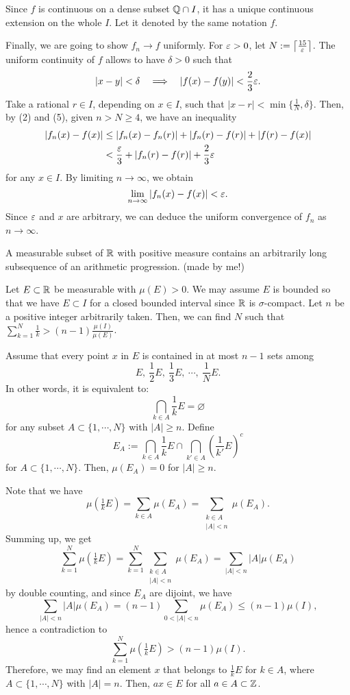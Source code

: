 \documentclass[12pt]{article}
\begin{document}
\begin{sol}
Since $f$ is continuous on a dense subset $\mathbb{Q}\cap I$, it has a unique continuous extension on the whole $I$.
Let it denoted by the same notation $f$.

\Step[4]
Finally, we are going to show $f_n\to f$ uniformly.
For $\varepsilon>0$, let $N:=\left\lceil\frac{15}{\varepsilon}\right\rceil$.
The uniform continuity of $f$ allows to have $\delta>0$ such that
\begin{align}|x-y|<\delta\impl|f(x)-f(y)|<\frac23\e.\end{align}
Take a rational $r\in I$, depending on $x\in I$, such that $|x-r|<\min\{\frac1N,\delta\}$.
Then, by (2) and (5), given $n>N\ge4$, we have an inequality
\begin{align*}
|f_n(x)-f(x)|&\le|f_n(x)-f_n(r)|+|f_n(r)-f(r)|+|f(r)-f(x)|\\
&<\frac{\varepsilon}3+|f_n(r)-f(r)|+\frac23\varepsilon
\end{align*}
for any $x\in I$.
By limiting $n\to\infty$, we obtain
\[\lim_{n\to\infty}|f_n(x)-f(x)|<\varepsilon.\]
Since $\varepsilon$ and $x$ are arbitrary, we can deduce the uniform convergence of $f_n$ as $n\to\infty$.
\end{sol}


\clearpage
\begin{prb}
A measurable subset of $\mathbb{R}$ with positive measure contains an arbitrarily long subsequence of an arithmetic progression. (made by me!)
\end{prb}
\begin{sol}
Let $E\subset\mathbb{R}$ be measurable with $\mu(E)>0$. We may assume $E$ is bounded so that we have $E\subset I$ for a closed bounded interval since $\mathbb{R}$ is $\sigma$-compact.
Let $n$ be a positive integer arbitrarily taken. Then, we can find $N$ such that $\sum_{k=1}^N\frac1k>(n-1)\frac{\mu(I)}{\mu(E)}$.

Assume that every point $x$ in $E$ is contained in at most $n-1$ sets among
\[E,\ \frac12E,\ \frac13E,\ \cdots,\ \frac1NE.\]
In other words, it is equivalent to:
\[\bigcap_{k\in A}\frac1kE=\varnothing\]
for any subset $A\subset\{1,\cdots,N\}$ with $|A|\ge n$.
Define
\[E_A:=\bigcap_{k\in A}\frac1kE\cap\bigcap_{k'\in A}\left(\frac1{k'}E\right)^c\]
for $A\subset\{1,\cdots,N\}$.
Then, $\mu(E_A)=0$ for $|A|\ge n$.

Note that we have
\[\mu(\tfrac1kE)=\sum_{k\in A}\mu(E_A)=\sum_{\substack{k\in A\\|A|<n}}\mu(E_A).\]
Summing up, we get
\[\sum_{k=1}^N\mu(\tfrac1kE)=\sum_{k=1}^N\sum_{\substack{k\in A\\|A|<n}}\mu(E_A)=\sum_{|A|<n}|A|\mu(E_A)\]
by double counting,
and since $E_A$ are dijoint, we have
\[\sum_{|A|<n}|A|\mu(E_A)=(n-1)\sum_{0<|A|<n}\mu(E_A)\le(n-1)\mu(I),\]
hence a contradiction to
\[\sum_{k=1}^N\mu(\tfrac1kE)>(n-1)\mu(I).\]
Therefore, we may find an element $x$ that belongs to $\frac1kE$ for $k\in A$, where $A\subset\{1,\cdots,N\}$ with $|A|=n$.
Then, $ax\in E$ for all $a\in A\subset\mathbb{Z}$.
\end{sol}
\end{document}
